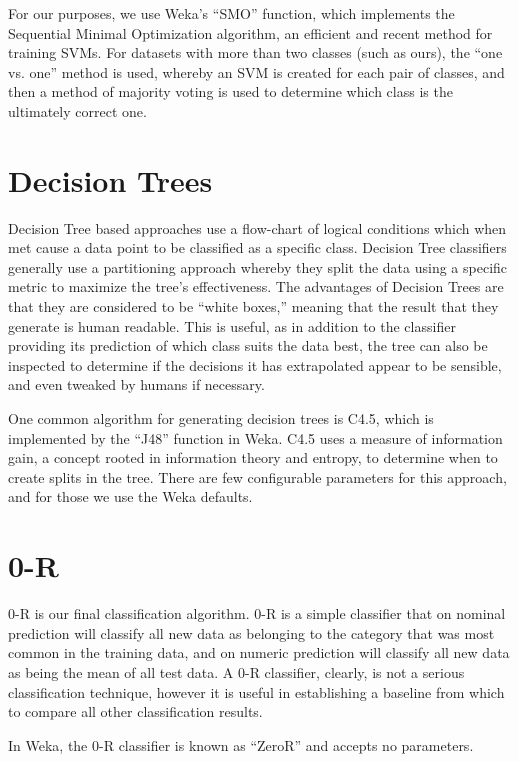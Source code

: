 For our purposes, we use Weka's ``SMO'' function, which implements the Sequential Minimal Optimization algorithm, an efficient and recent method for training SVMs. For datasets with more than two classes (such as ours), the ``one vs. one'' method is used, whereby an SVM is created for each pair of classes, and then a method of majority voting is used to determine which class is the ultimately correct one.

\section{Decision Trees}
Decision Tree based approaches use a flow-chart of logical conditions which when met cause a data point to be classified as a specific class. Decision Tree classifiers generally use a partitioning approach whereby they split the data using a specific metric to maximize the tree's effectiveness. The advantages of Decision Trees are that they are considered to be ``white boxes,'' meaning that the result that they generate is human readable. This is useful, as in addition to the classifier providing its prediction of which class suits the data best, the tree can also be inspected to determine if the decisions it has extrapolated appear to be sensible, and even tweaked by humans if necessary.

One common algorithm for generating decision trees is C4.5, which is implemented by the ``J48'' function in Weka. C4.5 uses a measure of information gain, a concept rooted in information theory and entropy, to determine when to create splits in the tree. There are few configurable parameters for this approach, and for those we use the Weka defaults.

\section{0-R}
0-R is our final classification algorithm. 0-R is a simple classifier that on nominal prediction will classify all new data as belonging to the category that was most common in the training data, and on numeric prediction will classify all new data as being the mean of all test data. A 0-R classifier, clearly, is not a serious classification technique, however it is useful in establishing a baseline from which to compare all other classification results.

In Weka, the 0-R classifier is known as ``ZeroR'' and accepts no parameters.

